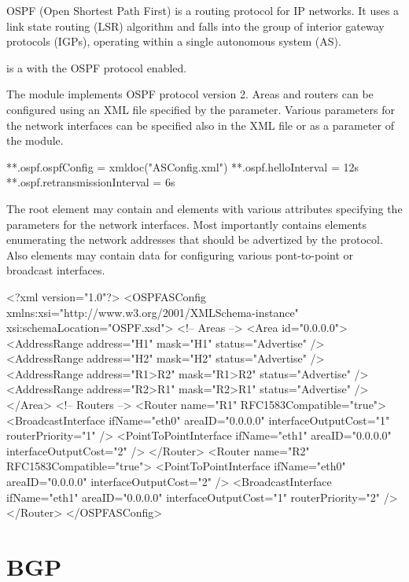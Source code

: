 OSPF (Open Shortest Path First) is a routing protocol for IP networks.
It uses a link state routing (LSR) algorithm and falls into the group
of interior gateway protocols (IGPs), operating within a single
autonomous system (AS).

 is a  with the OSPF protocol enabled.

The  module implements OSPF protocol version 2. Areas and routers
can be configured using an XML file specified by the  parameter.
Various parameters for the network interfaces can be specified also in the XML
file or as a parameter of the  module.

\begin{inifile}
**.ospf.ospfConfig = xmldoc("ASConfig.xml")
**.ospf.helloInterval = 12s
**.ospf.retransmissionInterval = 6s
\end{inifile}

The  root element may contain  and 
elements with various attributes specifying the parameters for the network
interfaces. Most importantly  contains  elements
enumerating the network addresses that should be advertized by the protocol.
Also  elements may contain data for configuring various pont-to-point
or broadcast interfaces.

\begin{XML}
<?xml version="1.0"?>
<OSPFASConfig xmlns:xsi="http://www.w3.org/2001/XMLSchema-instance" xsi:schemaLocation="OSPF.xsd">
  <!-- Areas -->
  <Area id="0.0.0.0">
    <AddressRange address="H1" mask="H1" status="Advertise" />
    <AddressRange address="H2" mask="H2" status="Advertise" />
    <AddressRange address="R1>R2" mask="R1>R2" status="Advertise" />
    <AddressRange address="R2>R1" mask="R2>R1" status="Advertise" />
  </Area>
  <!-- Routers -->
  <Router name="R1" RFC1583Compatible="true">
    <BroadcastInterface ifName="eth0" areaID="0.0.0.0" interfaceOutputCost="1" routerPriority="1" />
    <PointToPointInterface ifName="eth1" areaID="0.0.0.0" interfaceOutputCost="2" />
  </Router>
  <Router name="R2" RFC1583Compatible="true">
    <PointToPointInterface ifName="eth0" areaID="0.0.0.0" interfaceOutputCost="2" />
    <BroadcastInterface ifName="eth1" areaID="0.0.0.0" interfaceOutputCost="1" routerPriority="2" />
  </Router>
</OSPFASConfig>
\end{XML}

\section{BGP}
\label{sec:routing:bgp}

